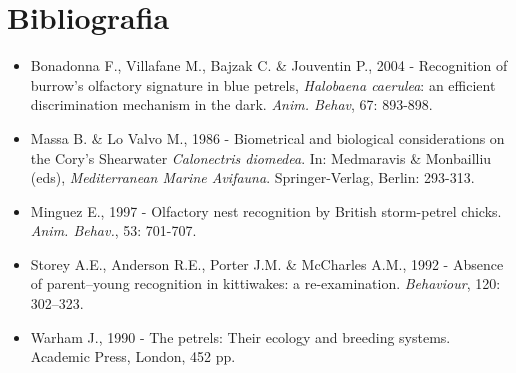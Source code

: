 \section*{Bibliografia}
\begin{itemize}\itemsep0pt
	\item Bonadonna F., Villafane M., Bajzak C. \& Jouventin P., 2004 -
Recognition of burrow{\textquoteright}s olfactory signature in blue
petrels, \textit{Halobaena caerulea}: an efficient discrimination
mechanism in the dark. \textit{Anim. Behav}, 67: 893-898.

	\item Massa B. \& Lo Valvo M., 1986 - Biometrical and biological
considerations on the Cory{\textquoteright}s Shearwater
\textit{Calonectris diomedea}. In: Medmaravis \& Monbailliu (eds),
\textit{Mediterranean Marine Avifauna}. Springer-Verlag, Berlin:
293-313.

	\item Minguez E., 1997 - Olfactory nest recognition by British storm-petrel
chicks. \textit{Anim. Behav.}, 53: 701-707. 

	\item Storey A.E., Anderson R.E., Porter J.M. \& McCharles A.M., 1992 -
Absence of parent--young recognition in kittiwakes: a re-examination.
\textit{Behaviour}, 120: 302--323.

	\item Warham J., 1990 - The petrels: Their ecology and breeding
systems. Academic Press, London, 452 pp.
\end{itemize}
